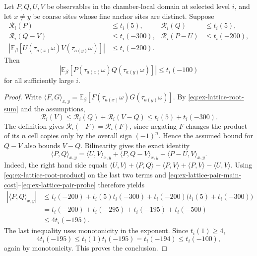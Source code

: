 \begin{proposition}
\label{prop:ex-lattice-finite-volume-pairing}
Let $P,Q,U,V$ be observables in the chamber-local domain at
selected level $i$, and let $x\ne y$ be coarse sites whose fine anchor
sites are distinct. Suppose
\begin{align}
 \mathcal R_i(P)&\le t_i(5), &\mathcal R_i(Q)&\le t_i(5),
 \label{eq:ex-lattice-pair-main-cost}\\
 \mathcal R_i(Q-V)&\le t_i(-300), &
 \mathcal R_i(P-U)&\le t_i(-200),
 \label{eq:ex-lattice-pair-local-errors}\\
 |\mathbb E_\beta[U(\tau_{a(x)} \omega)V(\tau_{a(y)} \omega)]|&\le t_i(-200).
 \label{eq:ex-lattice-pair-probe}
\end{align}
Then
\[
 |\mathbb E_\beta[P(\tau_{a(x)} \omega)Q(\tau_{a(y)} \omega)]|
 \le t_i(-100)
\]
for all sufficiently large $i$.
\end{proposition}
\begin{proof}
Write $\langle F,G\rangle_{x,y}=\mathbb E_\beta[F(\tau_{a(x)}\omega)G(\tau_{a(y)}\omega)]$. By \eqref{eq:ex-lattice-root-sum} and the assumptions,
\[
 \mathcal R_i(V)\le \mathcal R_i(Q)+\mathcal R_i(V-Q)
       \le t_i(5)+t_i(-300).
\]
The definition gives $\mathcal R_i(-F)=\mathcal R_i(F)$, since negating
$F$ changes the product of its $n$ cell copies only by the overall sign
$(-1)^n$. Hence the assumed bound for $Q-V$ also bounds $V-Q$.
Bilinearity gives the exact identity
\begin{equation}
 \langle P,Q\rangle_{x,y}
 =\langle U,V\rangle_{x,y}
  +\langle P,Q-V\rangle_{x,y}
  +\langle P-U,V\rangle_{x,y}.
 \label{eq:ex-lattice-pair-telescope}
\end{equation}
Indeed, the right hand side equals
$\langle U,V\rangle+\langle P,Q\rangle-\langle P,V\rangle
 +\langle P,V\rangle-\langle U,V\rangle$.
Using \eqref{eq:ex-lattice-root-product} on the last two terms and
\eqref{eq:ex-lattice-pair-main-cost}--\eqref{eq:ex-lattice-pair-probe}
therefore yields
\begin{align*}
 |\langle P,Q\rangle_{x,y}|
 &\le t_i(-200)+t_i(5)t_i(-300)
       +t_i(-200)\bigl(t_i(5)+t_i(-300)\bigr)\\
 &=t_i(-200)+t_i(-295)+t_i(-195)+t_i(-500)\\
 &\le4t_i(-195).
\end{align*}
The last inequality uses monotonicity in the exponent. Since $t_i(1)\ge4$,
\[
 4t_i(-195)\le t_i(1)t_i(-195)=t_i(-194)\le t_i(-100),
\]
again by monotonicity. This proves the conclusion.
\end{proof}

